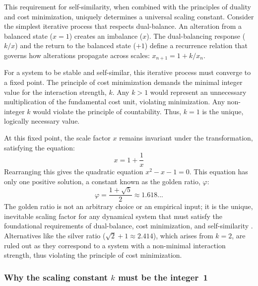 This requirement for self-similarity, when combined with the principles of duality and cost minimization, uniquely determines a universal scaling constant. Consider the simplest iterative process that respects dual-balance. An alteration from a balanced state (\(x=1\)) creates an imbalance (\(x\)). The dual-balancing response (\(k/x\)) and the return to the balanced state (\(+1\)) define a recurrence relation that governs how alterations propagate across scales: \(x_{n+1} = 1 + k/x_n\).

For a system to be stable and self-similar, this iterative process must converge to a fixed point. The principle of cost minimization demands the minimal integer value for the interaction strength, \(k\). Any \(k>1\) would represent an unnecessary multiplication of the fundamental cost unit, violating minimization. Any non-integer \(k\) would violate the principle of countability. Thus, \(k=1\) is the unique, logically necessary value.

At this fixed point, the scale factor \(x\) remains invariant under the transformation, satisfying the equation:
\begin{equation}
x = 1 + \frac{1}{x}
\end{equation}
Rearranging this gives the quadratic equation \(x^2 - x - 1 = 0\). This equation has only one positive solution, a constant known as the golden ratio, \(\varphi\):
\begin{equation}
\varphi = \frac{1 + \sqrt{5}}{2} \approx 1.618...
\end{equation}
The golden ratio is not an arbitrary choice or an empirical input; it is the unique, inevitable scaling factor for any dynamical system that must satisfy the foundational requirements of dual-balance, cost minimization, and self-similarity \parencite{Livio2002}. Alternatives like the silver ratio (\(\sqrt{2}+1 \approx 2.414\)), which arises from \(k=2\), are ruled out as they correspond to a system with a non-minimal interaction strength, thus violating the principle of cost minimization.

\subsubsection*{Why the scaling constant \texorpdfstring{$k$}{k} must be the integer 1}

